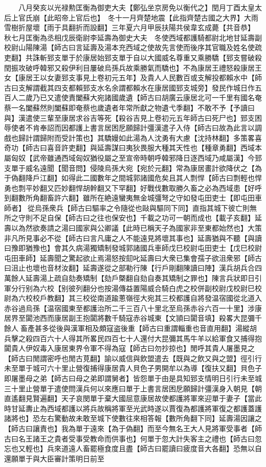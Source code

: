 　　八月癸亥以光禄勲匡衡為御吏大夫【鄭弘坐京房免以衡代之】閏月丁酉太皇太后上官氏崩【此昭帝上官后也】　冬十一月齊楚地震【此指齊楚古國之大界】大雨雪樹折屋壞【雨于具翻折而設翻】三年夏六月甲辰扶陽共侯韋玄成薨【共音恭】　秋七月匡衡為丞相戊辰衛尉李延壽為御史大夫　冬使西域都護騎都尉北地甘延壽副校尉山陽陳湯【師古曰言延壽及湯本充西域之使故先言使而後序其官職及姓名使疏吏翻】共誅斬郅支單于於康居始郅支單于自以大國威名尊重又乘勝驕【郅支嘗破殺閏振攻破呼韓邪又殺伊利目屢破烏孫兵故乘勝氣而驕也】不為康居王禮怒殺康居王女【康居王以女妻郅支事見上卷初元五年】及貴人人民數百或支解投都賴水中【師古曰支解謂截其四支都賴郅支水名余謂都賴水在康居國郅支城旁】發民作城日作五百人二歲乃已又遣使責闔蘇大宛諸國歲遺【師古曰胡廣云康居北可一千里有國名奄蔡一名闔蘇然則闔蘇即奄蔡也歲遺者年常所獻之物遺弋季翻】不敢不予【予讀曰與】漢遣使三輩至康居求谷吉等死【殺谷吉見上卷初元五年師古曰死尸也】郅支困辱使者不肯奉詔而因都護上書言居困戹願歸計彊漢遣子入侍【師古曰故為此言以調戲也歸計謂歸附而受計策也】其驕嫚如此湯為人沈勇有大慮【沈持林翻】多策畧喜奇功【師古曰喜音許吏翻】與延壽謀曰夷狄畏服大種其天性也【種章勇翻】西域本屬匈奴【武帝雖通西域匈奴猶役屬之至宣帝時朝呼韓邪降日逐西域乃咸屬漢】今郅支單于威名遠聞【聞音問】侵陵烏孫大宛【宛於元翻】常為康居畫計欲降伏之【為于偽翻降戶江翻】如得此二國數年之間城郭諸國危矣且其人剽悍【師古曰剽輕也悍勇也剽平妙翻又匹妙翻悍胡幹翻又下罕翻】好戰伐數取勝久畜之必為西域患【好呼到翻數所角翻畜許六翻】雖所在絶遠蠻夷無金城彊弩之守如發屯田吏士【即屯田車師者】從烏孫衆兵【師古曰驅率之令隨從也敺與驅同下同】直指其城下彼亡則無所之守則不足自保【師古曰之往也保安也】千載之功可一朝而成也【載子亥翻】延壽以為然欲奏請之湯曰國家與公卿議【此時已稱天子為國家非至東都始然也】大策非凡所見事必不從【師古曰言凡庸之人不能遠見將壞其事也】延壽猶與不聽【與讀曰豫即猶豫也】會其久病湯獨矯制發城郭諸國兵車師戊巳校尉屯田吏士【戊巳校尉屯田車師】延壽聞之驚起欲止焉湯怒按劎叱延壽曰大衆已集會孺子欲沮衆邪【師古曰沮止也壞也音材汝翻】延壽遂從之部勒行陳【行戶剛翻陳讀曰陣】漢兵胡兵合四萬餘人延壽湯上疏自劾奏矯制【劾戶槩翻自劾自奏其矯制之罪也】陳言兵狀即日引軍分行别為六校【别彼列翻分也按湯傳益置陽威合騎白虎之校併副校尉戊校尉巳校尉為六校校戶教翻】其三校從南道踰蔥嶺徑大宛其三校都護自將發温宿國從北道入赤谷過烏孫【温宿國東至都護治所二千三百八十里北至烏孫赤谷六百一十里】涉康居界至闐池西而康居副王抱闐將數千騎寇赤谷城東【文頴曰闐音填】殺畧大昆彌千餘人畜產甚多從後與漢軍相及頗寇盗後重【師古曰重謂輜重也音直用翻】湯縱胡兵擊之殺四百六十人得其所畧民四百七十人還付大昆彌其馬牛羊以給軍食又捕得抱闐貴人伊奴毒入康居東界令軍不得為寇【師古曰勿抄掠也】閒呼其貴人屠墨見之【師古曰閒謂密呼也閒古莧翻】諭以威信與飲盟遣去【既與之飲又與之盟】徑引行未至單于城可六十里止營復捕得康居貴人貝色子男開牟以為導【復扶又翻】貝色子即屠墨母之弟【師古曰母之弟即謂舅者】皆怨單于由是具知郅支情明日引行未至城三十里止營單于遣使問漢兵何以來應曰單于上書言居困戹願歸計彊漢身入朝見【朝直遙翻見賢遍翻】天子哀閔單于棄大國屈意康居故使都護將軍來迎單于妻子【當此時甘延夀止為西域都護以將兵故稱將軍至光武時遂以賈復為都護將軍復之都護蓋護諸將也】恐左右驚動故未敢至城下使數往來相答報【數所角翻下同】延壽湯因讓之【師古曰讓責也】我為單于遠來【為于偽翻】而至今無名王大人見將軍受事者【師古曰名王諸王之貴者受事受教命而供事也】何單于忽大計失客主之禮也【師古曰忽忘也又輕也】兵來道遠人畜罷極食度且盡【師古曰罷讀曰疲度音大各翻】恐無以自還願單于與大臣審計策明日前至